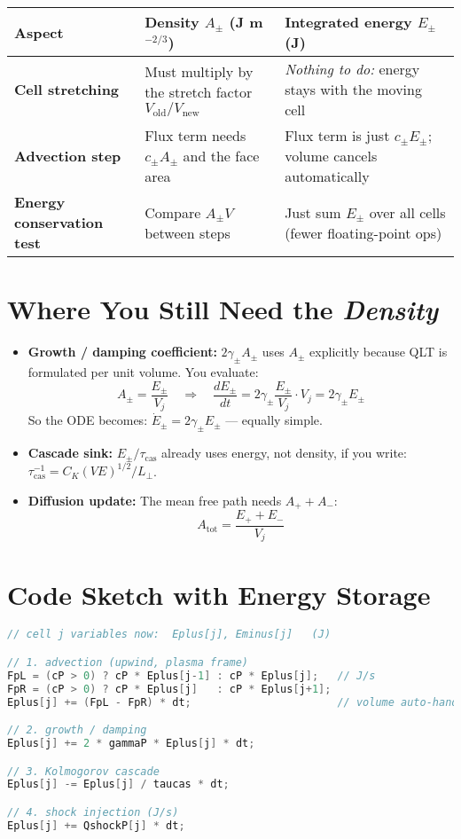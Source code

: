 \begin{center}
\begin{tabular}{@{}p{} | p{} | p{}@{}}
\toprule
\textbf{Aspect} &
\textbf{Density $A_\pm$ (J m$^{-2/3}$)} &
\textbf{Integrated energy $E_\pm$ (J)} \\
\midrule
\textbf{Cell stretching} &
Must multiply by the stretch factor $V_{\text{old}}/V_{\text{new}}$ &
\emph{Nothing to do:} energy stays with the moving cell \\
\textbf{Advection step} &
Flux term needs $c_\pm A_\pm$ and the face area &
Flux term is just $c_\pm E_\pm$; volume cancels automatically \\
\textbf{Energy conservation test} &
Compare $A_\pm V$ between steps &
Just sum $E_\pm$ over all cells (fewer floating-point ops) \\
\bottomrule
\end{tabular}
\end{center}

\section*{Where You Still Need the \emph{Density}}

\begin{itemize}
\item \textbf{Growth / damping coefficient:}  
$2\gamma_\pm A_\pm$ uses $A_\pm$ explicitly because QLT is formulated per unit volume.  
You evaluate:
\[
A_\pm = \frac{E_\pm}{V_j}
\quad \Longrightarrow \quad
\frac{dE_\pm}{dt} = 2\gamma_\pm \frac{E_\pm}{V_j} \cdot V_j = 2\gamma_\pm E_\pm
\]
So the ODE becomes: $\dot{E}_\pm = 2\gamma_\pm E_\pm$ — equally simple.

\item \textbf{Cascade sink:}  
$E_\pm/\tau_{\text{cas}}$ already uses energy, not density, if you write:  
$\tau_{\text{cas}}^{-1} = C_K (V E)^{1/2} / L_\perp$.

\item \textbf{Diffusion update:}  
The mean free path needs $A_+ + A_-$:
\[
A_{\text{tot}} = \frac{E_+ + E_-}{V_j}
\]
\end{itemize}

\section*{Code Sketch with Energy Storage}

\begin{lstlisting}[language=C++,basicstyle=\ttfamily\footnotesize]
// cell j variables now:  Eplus[j], Eminus[j]   (J)

// 1. advection (upwind, plasma frame)
FpL = (cP > 0) ? cP * Eplus[j-1] : cP * Eplus[j];   // J/s
FpR = (cP > 0) ? cP * Eplus[j]   : cP * Eplus[j+1];
Eplus[j] += (FpL - FpR) * dt;                       // volume auto-handled

// 2. growth / damping
Eplus[j] += 2 * gammaP * Eplus[j] * dt;

// 3. Kolmogorov cascade
Eplus[j] -= Eplus[j] / taucas * dt;

// 4. shock injection (J/s)
Eplus[j] += QshockP[j] * dt;
\end{lstlisting}

